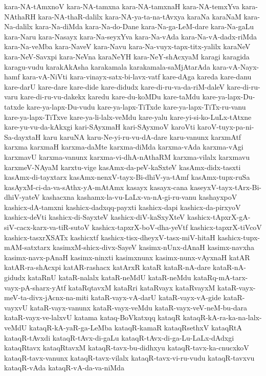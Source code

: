 {kara-NA-tAmxnoV
kara-NA-tamxna
kara-NA-tamxnaH
kara-NA-temxYva
kara-NAthaRH
kara-NA-thaR-dalilx
kara-NA-ya-ta-na-tAvxya
karaNa
karaNaM
kara-Na-dalilx
kara-Na-diMda
kara-Na-do-Dane
kara-Na-ga-LeM-dare
kara-Na-gaLu
kara-Naru
kara-Nasayx
kara-Na-seyxYva
kara-Na-vAda
kara-Na-vA-dadx-riMda
kara-Na-veMba
kara-NaveV
kara-Navu
kara-Na-vuyx-tapx-titx-yalilx
karaNeV
kara-NeV-Savxpi
kara-NeVna
karaNeYH
kara-NeY-shAcxyaM
karagi
karagida
karagu-vudu
karakAkAsha
karakamala
karakamala-saMjAtarAda
kara-vA-Nayx-hamf
kara-vA-NiVti
kara-vinayx-satx-bi-lavx-vatf
kare-dAga
kareda
kare-danu
kare-darU
kare-dare
kare-dide
kare-didudx
kare-di-ru-va-da-riM-daleV
kare-di-ru-varu
kare-di-ru-vu-dakekx
karedu
kare-du-koMDu
kare-taMdu
kare-ya-lapx-Du-tatxde
kare-ya-lapx-Du-vudu
kare-ya-lapx-TiTxde
kare-ya-lapx-TiTx-ru-vanu
kare-ya-lapx-TiTxve
kare-ya-li-lalx-veMdu
kare-yalu
kare-yi-si-ko-LuLx-tAtxne
kare-yu-vu-da-kAkxgi
kari-SAyxmaH
kari-SAyxmoV
karoVti
karoV-tuyx-pa-ni-Sa-dayxtaH
karu
karuNA
karu-Ne-yi-ru-vu-dA-dare
karu-vanunx
karxmAtf
karxma
karxmaH
karxma-daMte
karxma-diMda
karxma-vAda
karxma-vAgi
karxmavU
karxma-vanunx
karxma-vi-dhA-nAthaRM
karxma-vilalx
karxmavu
karxmeV-NAyaM
karxtu-vige
kasAmx-da-peV-kaSxteV
kasAmx-didx-tasxti
kasAmx-di-tayxtarx
kasAmx-nenxV-tayx-Bi-dhiV-ya-tAmf
kasAmx-tupx-ruSa
kasAyxM-ci-da-va-sAthx-yA-mAtAmx
kasayx
kasayx-cana
kaseyxV-tayx-tArx-Bi-dhiV-yateV
kashacxna
kashamx-la-vu-LaLx-va-nA-gi-ru-vanu
kashayxpoV
kashicx-dA-tamxni
kashicx-dadxqq-payxti
kashicx-dapi
kashicx-da-pirxyoV
kashicx-deVti
kashicx-di-SayxteV
kashicx-diV-kaSxyXteV
kashicx-tApxrX-gA-siV-cacx-karx-va-tiR-sutoV
kashicx-tapxrX-boV-dha-yeVtf
kashicx-tapxrX-tiVcoV
kashicx-tasxrXSATx
kashicxtf
kashicx-tisx-dheyxV-tasx-miV-hitaH
kashicx-tupx-mAM-satxtarx
kasimxM-shicx-divx-SayeV
kasimx-nUnx-dAnaH
kasimx-navxha
kasimx-navx-pAnaH
kasimx-ninxti
kasimxnunx
kasimx-nunx-vAyxnaH
katAR
katAR-ra-shAcxpi
katAR-rashacx
katArxR
kataR
kataR-nA-dare
kataR-nA-gidudx
kataRnU
kataR-nalalx
kataR-neMdU
kataR-neMdu
kataRq-mA-tarx-vayx-pA-sharx-yAtf
kataRqtavxM
kataRri
kataRvayx
kataRvayxM
kataR-vayx-meV-ta-divx-jAcnx-na-miti
kataR-vayx-vA-darU
kataR-vayx-vA-gide
kataR-vayxvU
kataR-vayx-vanunx
kataR-vayx-veMdu
kataR-vayx-veV-neM-bu-dara
kataR-vayx-ve-lalxvU
katama
kataq-BoVkatxqq
kataqR
kataqR-kA-ra-ka-na-lalx-veMdU
kataqR-kA-yaR-ga-LeMba
kataqR-kamaR
kataqRsethxV
kataqRtA
kataqR-tAvxdi
kataqR-tAvx-di-gaLu
kataqR-tAvx-di-ga-Lu-LaLx-dAdxgi
kataqRtavx
kataqRtavxM
kataqR-tavx-bu-didhxyu
kataqR-tavx-ka-cnucxkoV
kataqR-tavx-vanunx
kataqR-tavx-vilalx
kataqR-tavx-vi-ru-vudu
kataqR-tavxvu
kataqR-vAda
kataqR-vA-da-va-niMda
}
